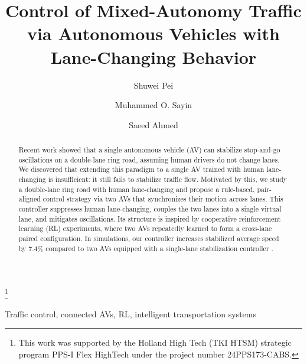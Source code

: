 \documentclass{ifacconf}
\begin{document}
\begin{frontmatter}

\title{Control of Mixed-Autonomy Traffic via Autonomous Vehicles with Lane-Changing Behavior}

\thanks[footnoteinfo]{This work was supported by the Holland High Tech (TKI HTSM) strategic program PPS-I Flex HighTech under the project number 24PPS173-CABS.}




\author[NL]{Shuwei Pei} 
\author[TK]{Muhammed O. Sayin}
\author[NL]{Saeed Ahmed} 

\address[NL]{Engineering and Technology institute Groningen, Faculty of Science and Engineering, University of Groningen, 9747 AG Groningen, the Netherlands (e-mails: s.pei@rug.nl, s.ahmed@rug.nl)}
\address[TK]{Department of Electrical, Electronics Engineering, Bilkent University, TR-06800 Ankara, Turkey (e-mail: sayin@ee.bilkent.edu.tr)}

\begin{abstract}                
Recent work \citep{9765650} showed that a single autonomous vehicle (AV) can stabilize stop-and-go oscillations on a double-lane ring road, assuming human drivers do not change lanes. We discovered that extending this paradigm to a single AV trained with human lane-changing is insufficient: it still fails to stabilize traffic flow. Motivated by this, we study a double-lane ring road with human lane-changing and propose a rule-based, pair-aligned control strategy via two AVs that synchronizes their motion across lanes. This controller suppresses human lane-changing, couples the two lanes into a single virtual lane, and mitigates oscillations. Its structure is inspired by cooperative reinforcement learning (RL) experiments, where two AVs repeatedly learned to form a cross-lane paired configuration. In simulations, our controller increases stabilized average speed by 7.4\% compared to two AVs equipped with a single-lane stabilization controller \citep{9765650}.
\end{abstract}

\begin{keyword}
Traffic control, connected AVs, RL, intelligent transportation systems
\end{keyword}

\end{frontmatter}
\end{document}
